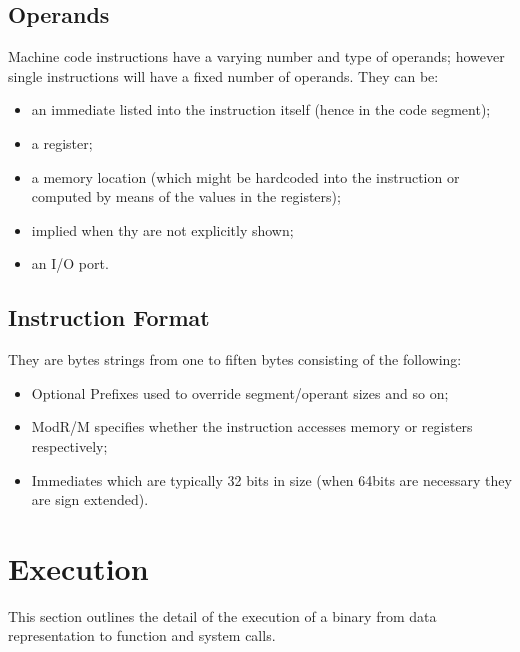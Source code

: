 \subsection{Operands}
Machine code instructions have a varying number and type of operands; however single instructions will have a fixed number of operands. They can be:
\begin{itemize}
    \item an immediate listed into the instruction itself (hence in the code segment);
    \item a register;
    \item a memory location (which might be hardcoded into the instruction or computed by means of the values in the registers);
    \item implied when thy are not explicitly shown;
    \item an I/O port.
\end{itemize}
\subsection{Instruction Format}
They are bytes strings from one to fiften bytes consisting of the following:
\begin{itemize} 
    \item Optional Prefixes used to override segment/operant sizes and so on;
    \item ModR/M specifies whether the instruction accesses memory or registers respectively;
    \item Immediates which are typically 32 bits in size (when 64bits are necessary they are sign extended).
\end{itemize}

\section{Execution}
This section outlines the detail of the execution of a binary from data representation to function and system calls.

